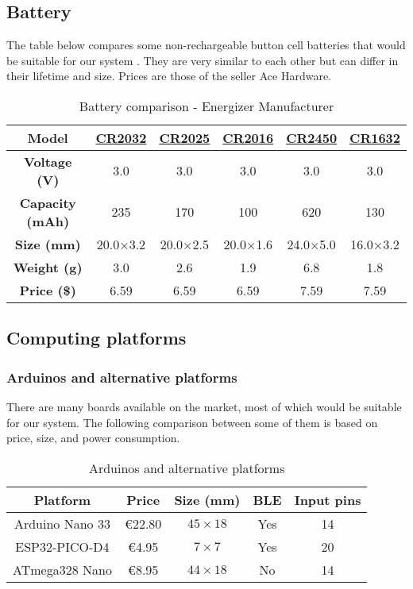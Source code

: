 \subsection{Battery}
The table below compares some non-rechargeable button cell batteries that would be suitable for our system \cite{b7}.
They are very similar to each other but can differ in their lifetime and size. Prices are those of the seller Ace Hardware.
\begin{table}[!h]
    \scriptsize
    \centering
    \begin{tabular}{c c c c c c}
        \hline
        \textbf{Model} & \href{https://www.energizer.com/specialty-batteries/2032-battery}{CR2032} & \href{https://www.energizer.com/specialty-batteries/2025-battery}{CR2025} & \href{https://www.energizer.com/specialty-batteries/2016-battery}{CR2016} & \href{https://www.energizer.com/specialty-batteries/2450-battery}{CR2450} & \href{https://www.energizer.com/specialty-batteries/1632-battery}{CR1632}\\
        \hline
        \textbf{Voltage (V)} & 3.0 & 3.0 & 3.0 & 3.0 & 3.0\\
        \textbf{Capacity (mAh)} & 235 & 170 & 100 & 620 & 130\\
        \textbf{Size (mm)} & 20.0×3.2 & 20.0×2.5 & 20.0×1.6 & 24.0×5.0 & 16.0×3.2\\
        \textbf{Weight (g)} & 3.0 & 2.6 & 1.9 & 6.8 & 1.8\\
        \textbf{Price (\$)} & 6.59 & 6.59 & 6.59 & 7.59 & 7.59\\
        \hline
        \end{tabular}
    \caption{Battery comparison - Energizer Manufacturer}
    \label{tab:battery_comparison}
\end{table}

\subsection{Computing platforms}
\subsubsection{Arduinos and alternative platforms}
There are many boards available on the market, most of which would be suitable for
our system. The following comparison between some of them is based on price, size,
and power consumption.
\begin{table}[!h]
    \centering
    \begin{tabular}{c c c c c}
        \hline
        \textbf{Platform} & \textbf{Price} & \textbf{Size (mm)} & \textbf{BLE} & \textbf{Input pins} \\
        \hline
        Arduino Nano 33 & €22.80 & $45 \times 18$ & Yes & 14 \\
        ESP32-PICO-D4 & €4.95 & $7 \times 7$ & Yes & 20 \\
        ATmega328 Nano & €8.95 & $44 \times 18$ & No & 14 \\
        \hline
        \end{tabular}
    \caption{Arduinos and alternative platforms}
    \label{tab:arduinos_alternative_platforms}
\end{table}

